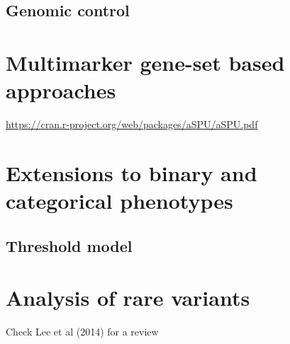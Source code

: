 \documentclass[]{book}
\theoremstyle{definition}
\theoremstyle{definition}
\theoremstyle{definition}
\theoremstyle{remark}
\begin{document}
\subsection{Genomic control}\label{genomic-control}

\section{Multimarker gene-set based
approaches}\label{multimarker-gene-set-based-approaches}

\url{https://cran.r-project.org/web/packages/aSPU/aSPU.pdf}

\section{Extensions to binary and categorical
phenotypes}\label{extensions-to-binary-and-categorical-phenotypes}

\subsection{Threshold model}\label{threshold-model}

\section{Analysis of rare variants}\label{analysis-of-rare-variants}

Check Lee et al (2014) for a review
\end{document}
